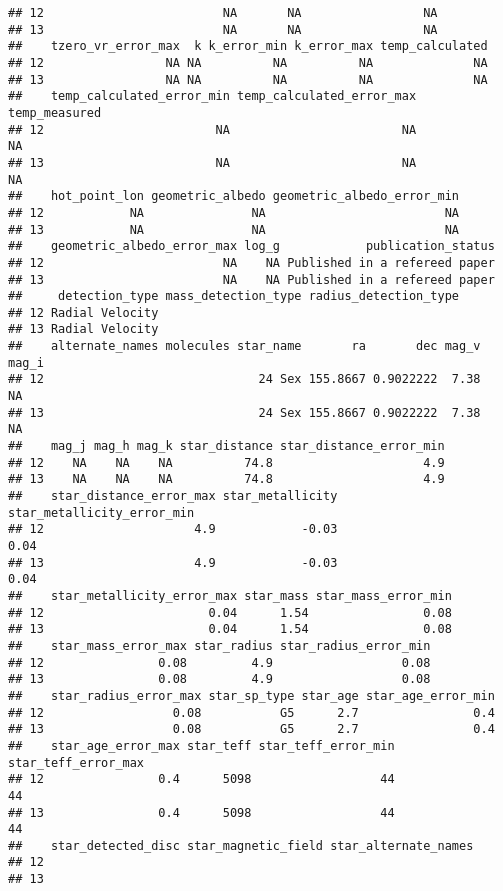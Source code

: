 \documentclass[]{article}
\begin{document}
\begin{verbatim}
## 12                         NA       NA                 NA
## 13                         NA       NA                 NA
##    tzero_vr_error_max  k k_error_min k_error_max temp_calculated
## 12                 NA NA          NA          NA              NA
## 13                 NA NA          NA          NA              NA
##    temp_calculated_error_min temp_calculated_error_max temp_measured
## 12                        NA                        NA            NA
## 13                        NA                        NA            NA
##    hot_point_lon geometric_albedo geometric_albedo_error_min
## 12            NA               NA                         NA
## 13            NA               NA                         NA
##    geometric_albedo_error_max log_g            publication_status
## 12                         NA    NA Published in a refereed paper
## 13                         NA    NA Published in a refereed paper
##     detection_type mass_detection_type radius_detection_type
## 12 Radial Velocity                                          
## 13 Radial Velocity                                          
##    alternate_names molecules star_name       ra       dec mag_v mag_i
## 12                              24 Sex 155.8667 0.9022222  7.38    NA
## 13                              24 Sex 155.8667 0.9022222  7.38    NA
##    mag_j mag_h mag_k star_distance star_distance_error_min
## 12    NA    NA    NA          74.8                     4.9
## 13    NA    NA    NA          74.8                     4.9
##    star_distance_error_max star_metallicity star_metallicity_error_min
## 12                     4.9            -0.03                       0.04
## 13                     4.9            -0.03                       0.04
##    star_metallicity_error_max star_mass star_mass_error_min
## 12                       0.04      1.54                0.08
## 13                       0.04      1.54                0.08
##    star_mass_error_max star_radius star_radius_error_min
## 12                0.08         4.9                  0.08
## 13                0.08         4.9                  0.08
##    star_radius_error_max star_sp_type star_age star_age_error_min
## 12                  0.08           G5      2.7                0.4
## 13                  0.08           G5      2.7                0.4
##    star_age_error_max star_teff star_teff_error_min star_teff_error_max
## 12                0.4      5098                  44                  44
## 13                0.4      5098                  44                  44
##    star_detected_disc star_magnetic_field star_alternate_names
## 12                                                            
## 13
\end{verbatim}
\end{document}
